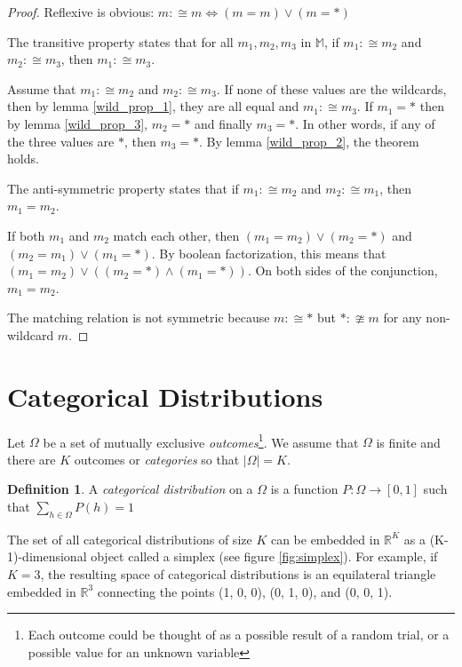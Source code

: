 \documentclass[twoside]{article}
\theoremstyle{plain}%
\theoremstyle{definition}
\newtheorem{definition}{Definition}[section]
\theoremstyle{remark}
\begin{document}
\begin{proof}
Reflexive is obvious: \(m :\cong m \Longleftrightarrow (m = m) \vee (m = \ast)\)

The transitive property states that for all \(m_1, m_2, m_3\) in \(\mathbb{M}\), if \(m_1 :\cong m_2\) and \(m_2 :\cong m_3\), then \(m_1 :\cong m_3\).

Assume that \(m_1 :\cong m_2\) and \(m_2 :\cong m_3\). If none of these values are the wildcards, then by lemma \ref{wild_prop_1}, they are all equal and \(m_1 :\cong m_3\). If \(m_1 = \ast\) then by lemma \ref{wild_prop_3}, \(m_2 = \ast\) and finally \(m_3 = \ast\). In other words, if any of the three values are \(\ast\), then \(m_3 = \ast\). By lemma \ref{wild_prop_2}, the theorem holds.

The anti-symmetric property states that if \(m_1 :\cong m_2\) and \(m_2 :\cong m_1\), then \(m_1 = m_2\).

If both \(m_1\) and \(m_2\) match each other, then \((m_1 = m_2) \vee (m_2 = \ast)\) and \((m_2 = m_1) \vee (m_1 = \ast)\). By boolean factorization, this means that \((m_1 = m_2) \vee ((m_2 = \ast) \wedge (m_1 = \ast))\). On both sides of the conjunction, \(m_1 = m_2\).

The matching relation is not symmetric because \(m :\cong \ast\) but \(\ast :\ncong m\) for any non-wildcard \(m\).
\end{proof}

\section{Categorical Distributions}

Let \(\Omega\) be a set of mutually exclusive \textit{outcomes}\footnote{Each outcome could be thought of as a possible result of a random trial, or a possible value for an unknown variable}. We assume that \(\Omega\) is finite and there are \(K\) outcomes or \textit{categories} so that \(|\Omega| = K\).

\begin{definition}
\label{def:categorical_abs}
A \textit{categorical distribution} on a \(\Omega\) is a function \(P: \Omega \rightarrow [0, 1]\) such that \(\sum_{h \in \Omega} P(h) = 1\)
\end{definition}

The set of all categorical distributions of size \(K\) can be embedded in \(\mathbb{R}^K\) as a (K-1)-dimensional object called a simplex (see figure \ref{fig:simplex}). For example, if \(K = 3\), the resulting space of categorical distributions is an equilateral triangle embedded in \(\mathbb{R}^3\) connecting the points (1, 0, 0), (0, 1, 0), and (0, 0, 1).
\end{document}
